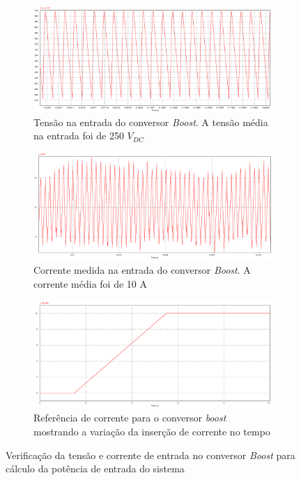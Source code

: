 \begin{figure}[!hbt]
	\centering
	\begin{subfigure}[b]{0.7\textwidth}
		\centering
		\includegraphics[width=\textwidth]{figuras/sim_figures/inversor_e_boost/tensao_entrada_boost_2.PNG}
		\caption{Tensão na entrada do conversor \textit{Boost}. A tensão média na entrada foi de 250 $V_{DC}$}
	\end{subfigure}
	
	\begin{subfigure}[b]{0.7\textwidth}
		\centering
		\includegraphics[width=\textwidth]{figuras/sim_figures/inversor_e_boost/corrente_entrada_boost.PNG}
		\caption{Corrente medida na entrada do conversor \textit{Boost}. A corrente média foi de 10 A}
	\end{subfigure}

	\begin{subfigure}[b]{0.7\textwidth}
		\centering
		\includegraphics[width=\textwidth]{figuras/sim_figures/inversor_e_boost/corrente_referencia_boost.PNG}
		\caption{Referência de corrente para o conversor \textit{boost} mostrando a variação da inserção de corrente no tempo}
	\end{subfigure}

	\caption{Verificação da tensão e corrente de entrada no conversor \textit{Boost} para cálculo da potência de entrada do sistema}
    \label{fig:sim-tensao-corrente-boost}
\end{figure}


